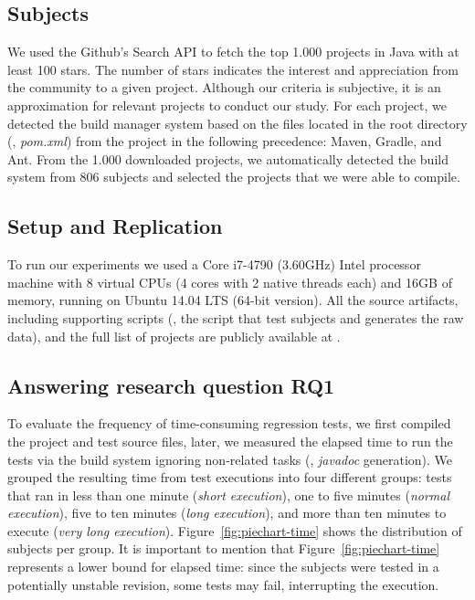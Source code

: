 \subsection{Subjects}
\label{sec:subjects}

We used the Github's Search API to fetch the top 1.000 projects in
Java with at least 100 stars. The number of stars indicates the
interest and appreciation from the community to a given project.
 Although our
criteria is subjective, it is an approximation for relevant projects
to conduct our study. For each project, we detected the build manager
system based on the files located in the root directory (\eg,
\emph{pom.xml}) from the project in the following precedence: Maven,
Gradle, and Ant. From the 1.000 downloaded projects, we automatically
detected the build system from 806 subjects and selected the 
projects that we were able to compile.

\subsection{Setup and Replication}
\label{sec:setup}

To run our experiments we used a Core i7-4790 (3.60GHz) Intel
processor machine with 8 virtual CPUs (4 cores with 2 native threads
each) and 16GB of memory, running on Ubuntu 14.04 LTS (64-bit
version).  All the source
artifacts, including supporting scripts (\eg, the script that test
subjects and generates the raw data), and the full list of projects
are publicly available at .

\subsection{Answering research question RQ1}
\label{sec:rqone}


To evaluate the frequency of time-consuming regression tests, we first
compiled the project and test source files, later, we measured the
elapsed time to run the tests via the build system ignoring
non-related tasks (\eg, \emph{javadoc} generation).  We grouped the
resulting time from test executions into four different groups: tests
that ran in less than one minute (\emph{short execution}), one to five
minutes (\emph{normal execution}), five to ten minutes (\emph{long
execution}), and more than ten minutes to execute (\emph{very long
execution}).  Figure~\ref{fig:piechart-time} shows the distribution
of subjects per group. It is important to mention that
Figure~\ref{fig:piechart-time} represents a lower bound for elapsed
time: since the subjects were tested in a potentially unstable
revision, some tests may fail, interrupting the execution.

